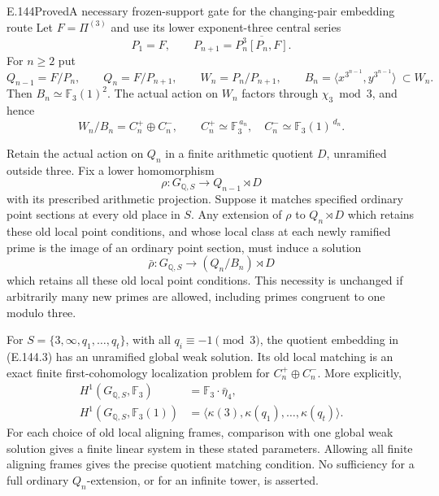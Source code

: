 \begin{result}{E.144}{Proved}{A necessary frozen-support gate for the changing-pair embedding route}
Let \(F=\Pi^{(3)}\) and use its lower exponent-three
central series
\[
 P_1=F,\qquad P_{n+1}=\overline{P_n^3[P_n,F]} .
 \]
For \(n\ge2\) put
\[
 Q_{n-1}=F/P_n,\qquad Q_n=F/P_{n+1},\qquad
 W_n=P_n/P_{n+1},\qquad
 B_n=\langle x^{3^{n-1}},y^{3^{n-1}}\rangle
                         \ \subset W_n .
 \tag{E.144.1}
\]
Then \(B_n\simeq\mathbb F_3(1)^2\).
The actual action on \(W_n\) factors through
\(\chi_3\bmod3\), and hence
\[
 W_n/B_n=C_n^+\oplus C_n^-,
 \qquad C_n^+\simeq\mathbb F_3^{\,a_n},\quad
 C_n^-\simeq\mathbb F_3(1)^{\,d_n}.
 \tag{E.144.2}
\]

Retain the actual action on \(Q_n\) in a finite
arithmetic quotient \(D\), unramified outside
three. Fix a lower homomorphism
\[
 \rho:G_{\mathbb Q,S}\longrightarrow Q_{n-1}\rtimes D
 \]
with its prescribed arithmetic projection.
Suppose it matches specified ordinary point
sections at every old place in \(S\).
Any extension of \(\rho\) to \(Q_n\rtimes D\)
which retains these old local point conditions,
and whose local class at each newly ramified
prime is the image of an ordinary point section,
must induce a solution
\[
 \bar\rho:G_{\mathbb Q,S}\longrightarrow
                         (Q_n/B_n)\rtimes D
 \tag{E.144.3}
\]
which retains all these old local point
conditions. This necessity is unchanged if
arbitrarily many new primes are allowed,
including primes congruent to one modulo three.

For \(S=\{3,\infty,q_1,\ldots,q_t\}\), with all
\(q_i\equiv-1\pmod3\), the quotient embedding in
(E.144.3) has an unramified global weak solution.
Its old local matching is an exact finite
first-cohomology localization problem for
\(C_n^+\oplus C_n^-\). More explicitly,
\[
 \begin{split}
 H^1(G_{\mathbb Q,S},\mathbb F_3)
       &=\mathbb F_3\cdot\bar\eta_4,\\
 H^1(G_{\mathbb Q,S},\mathbb F_3(1))
       &=\langle\kappa(3),\kappa(q_1),\ldots,
                                      \kappa(q_t)\rangle .
 \end{split}
 \tag{E.144.4}
\]
For each choice of old local aligning frames,
comparison with one global weak solution gives
a finite linear system in these stated parameters.
Allowing all finite aligning frames gives the
precise quotient matching condition. No
sufficiency for a full ordinary \(Q_n\)-extension,
or for an infinite tower, is asserted.
\end{result}
